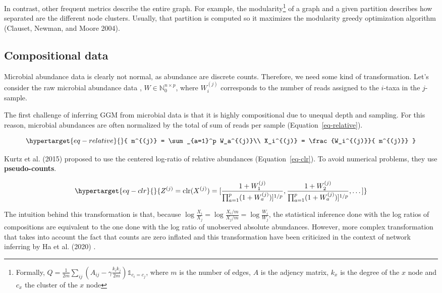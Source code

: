 \documentclass[
  letterpaper,
  DIV=11,
  numbers=noendperiod]{scrartcl}
\begin{document}
In contrast, other frequent metrics describe the entire graph. For
example, the modularity\footnote{Formally,
  \(Q = \frac{1}{2m}\sum_{ij}\left( A_{ij} - \gamma \frac{k_ik_j}{2m}\right )\mathbb1_{c_i = c_j}\),
  where \(m\) is the number of edges, \(A\) is the adjency matrix,
  \(k_x\) is the degree of the \(x\) node and \(c_x\) the cluster of the
  \(x\) node} of a graph and a given partition describes how separated
are the different node clusters. Usually, that partition is computed so
it maximizes the modularity greedy optimization algorithm (Clauset,
Newman, and Moore 2004).

\hypertarget{compositional-data}{%
\subsection{Compositional data}\label{compositional-data}}

Microbial abundance data is clearly not normal, as abundance are
discrete counts. Therefore, we need some kind of transformation. Let's
consider the raw microbial abundance data ,
\(W \in \mathbb N_0^{n\times p}\), where \(W_i^{(j)}\) corresponds to
the number of reads assigned to the \(i\)-taxa in the \(j\)-sample.

The first challenge of inferring GGM from microbial data is that it is
highly compositional due to unequal depth and sampling. For this reason,
microbial abundances are often normalized by the total of sum of reads
per sample (Equation~\ref{eq-relative}).

\begin{equation}\protect\hypertarget{eq-relative}{}{
m^{(j)} = \sum_{a=1}^p W_a^{(j)}\\
X_i^{(j)}  = \frac {W_i^{(j)}}{
m^{(j)}}
}\label{eq-relative}\end{equation}

Kurtz et al. (2015) proposed to use the centered log-ratio of relative
abundances (Equation~\ref{eq-clr}). To avoid numerical problems, they
use \textbf{pseudo-counts}.

\begin{equation}\protect\hypertarget{eq-clr}{}{
Z^{(j)} = \text{clr}(X^{(j)}) = [\frac{1+W_1^{(j)}}{\prod _{a=1}^p (1+W_a^{(j)}) ]^{1/p}}, \frac{1+W_2^{(j)}}{\prod _{a=1}^p (1+W_a^{(j)}) ]^{1/p}}, \dots]
}\label{eq-clr}\end{equation}

The intuition behind this transformation is that, because
\(\log{\frac {X_i}{X_j}} = \log{\frac {X_i/m}{X_j/m}} = \log{\frac {W_i}{W_j}}\),
the statistical inference done with the log ratios of compositions are
equivalent to the one done with the log ratio of unobserved absolute
abundances. However, more complex transformation that takes into account
the fact that counts are zero inflated and this transformation have been
criticized in the context of network inferring by Ha et al. (2020) .
\end{document}
